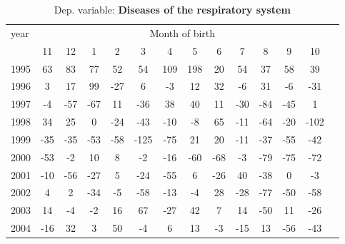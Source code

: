  \begin{table}[H] \begin{threeparttable} \centering \caption{Dep. variable: \textbf{Diseases of the respiratory system}} {\def\sym#1{\ifmmode^{#1}\else\(^{#1}\)\fi} \begin{tabular}{l*{13}{c}} \toprule year & \multicolumn{12}{c}{Month of birth} \\ \cmidrule(lr){2-13} 
            &          11&          12&           1&           2&           3&           4&           5&           6&           7&           8&           9&          10\\
1995        &          63&          83&          77&          52&          54&         109&         198&          20&          54&          37&          58&          39\\
1996        &           3&          17&          99&         -27&           6&          -3&          12&          32&          -6&          31&          -6&         -31\\
1997        &          -4&         -57&         -67&          11&         -36&          38&          40&          11&         -30&         -84&         -45&           1\\
1998        &          34&          25&           0&         -24&         -43&         -10&          -8&          65&         -11&         -64&         -20&        -102\\
1999        &         -35&         -35&         -53&         -58&        -125&         -75&          21&          20&         -11&         -37&         -55&         -42\\
2000        &         -53&          -2&          10&           8&          -2&         -16&         -60&         -68&          -3&         -79&         -75&         -72\\
2001        &         -10&         -56&         -27&           5&         -24&         -55&           6&         -26&          40&         -38&           0&          -3\\
2002        &           4&           2&         -34&          -5&         -58&         -13&          -4&          28&         -28&         -77&         -50&         -58\\
2003        &          14&          -4&          -2&          16&          67&         -27&          42&           7&          14&         -50&          11&         -26\\
2004        &         -16&          32&           3&          50&          -4&           6&          13&          -3&         -15&          13&         -56&         -43\\

\end{tabular}}
\end{threeparttable}
\end{table}

